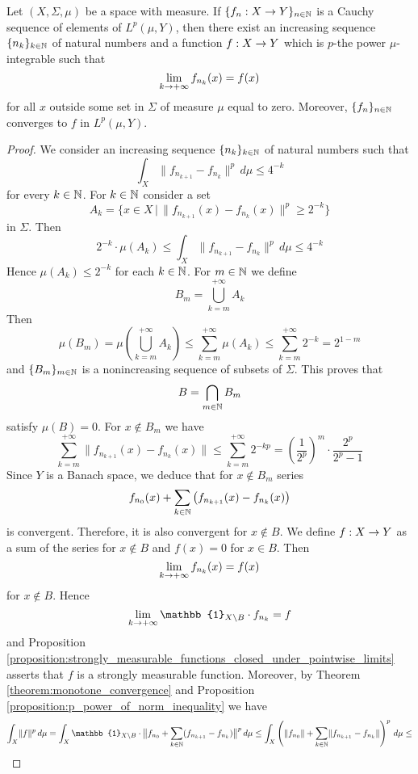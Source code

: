 \begin{theorem}[Riesz]\label{theorem:riesz_theorem}
Let $(X,\Sigma,\mu)$ be a space with measure. If $\{f_n:X\rightarrow Y\}_{n\in {\mathbb N}}$ is a Cauchy sequence of elements of $L^p(\mu,Y)$, then there exist an increasing sequence $\{n_k\}_{k\in {\mathbb N}}$ of natural numbers and a function $f:X\rightarrow Y$ which is $p$-the power $\mu$-integrable such that
$$\lim_{k\rightarrow +\infty}f_{n_k}(x) = f(x)$$
for all $x$ outside some set in $\Sigma$ of measure $\mu$ equal to zero. Moreover, $\{f_n\}_{n\in {\mathbb N}}$ converges to $f$ in $L^p(\mu,Y)$.
\end{theorem}
\begin{proof}
We consider an increasing sequence $\{n_k\}_{k\in {\mathbb N}}$ of natural numbers such that
$$\int_X\lVert f_{n_{k+1}} - f_{n_k}\rVert^p\,d\mu \leq 4^{-k}$$
for every $k\in {\mathbb N}$. For $k\in {\mathbb N}$ consider a set
$$A_k = \big\{x \in X\,\big|\,\lVert f_{n_{k+1}}(x) - f_{n_k}(x)\rVert^p \geq 2^{-k}\big\}$$
in $\Sigma$. Then
$$2^{-k} \cdot \mu(A_k)\leq \int_X\lVert f_{n_{k+1}}-f_{n_k}\rVert^p \,d\mu \leq 4^{-k}$$
Hence $\mu(A_k)\leq 2^{-k}$ for each $k\in {\mathbb N}$. For $m\in {\mathbb N}$ we define 
$$B_m = \bigcup_{k=m}^{+\infty}A_k$$
Then
$$\mu(B_m) = \mu\left(\bigcup_{k=m}^{+\infty}A_k\right) \leq \sum_{k = m}^{+\infty}\mu(A_k) \leq \sum_{k=m}^{+\infty}2^{-k} = 2^{1 - m}$$
and $\{B_m\}_{m\in {\mathbb N}}$ is a nonincreasing sequence of subsets of $\Sigma$. This proves that
$$B = \bigcap_{m\in {\mathbb N}}B_m$$
satisfy $\mu(B) = 0$. For $x\not \in B_m$ we have
$$\sum_{k = m}^{+\infty}\lVert f_{n_{k+1}}(x) - f_{n_k}(x)\rVert \leq \sum_{k=m}^{+\infty}2^{-kp} = \left(\frac{1}{2^p}\right)^m\cdot \frac{2^p}{2^p - 1}$$
Since $Y$ is a Banach space, we deduce that for $x\not \in B_m$ series
$$f_{n_0}(x) + \sum_{k\in {\mathbb N}}\left(f_{n_{k+1}}(x) - f_{n_k}(x)\right)$$
is convergent. Therefore, it is also convergent for $x\not \in B$. We define $f:X\rightarrow Y$ as a sum of the series for $x\not \in B$ and $f(x) = 0$ for $x\in B$. Then
$$\lim_{k\rightarrow +\infty}f_{n_k}(x) = f(x)$$
for $x \not \in B$. Hence
$$\lim_{k\ra +\infty}\mathbb{1}_{X\setminus B}\cdot f_{n_k} = f$$
and Proposition \ref{proposition:strongly_measurable_functions_closed_under_pointwise_limits} asserts that $f$ is a strongly measurable function. Moreover, by Theorem \ref{theorem:monotone_convergence} and Proposition 
\ref{proposition:p_power_of_norm_inequality} we have
$$\int_X\lVert f\rVert^p \,d\mu = \int_X\mathbb{1}_{X\setminus B}\cdot \big \lVert f_{n_0} + \sum_{k\in \NN}(f_{n_{k+1}} - f_{n_k})\big \rVert^p \,d\mu \leq \int_X\left(\lVert f_{n_0}\rVert  + \sum_{k\in \NN}\lVert f_{n_{k+1}}-f_{n_k}\rVert \right)^p\,d\mu \leq $$

\end{proof}
